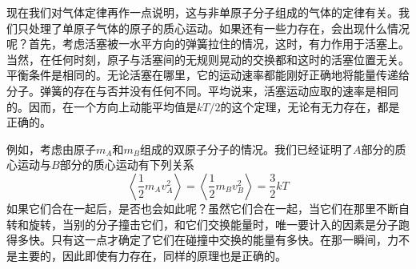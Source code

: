 现在我们对气体定律再作一点说明，这与非单原子分子组成的气体的定律有关。我们只处理了单原子气体的原子的质心运动。如果还有一些力存在，会出现什么情况呢？首先，考虑活塞被一水平方向的弹簧拉住的情况，这时，有力作用于活塞上。当然，在任何时刻，原子与活塞间的无规则晃动的交换都和这时的活塞位置无关。平衡条件是相同的。无论活塞在哪里，它的运动速率都能刚好正确地将能量传递给分子。弹簧的存在与否并没有任何不同。平均说来，活塞运动应取的速率是相同的。因而，在一个方向上动能平均值是$kT/2$的这个定理，无论有无力存在，都是正确的。

例如，考虑由原子$m_A$和$m_B$组成的双原子分子的情况。我们已经证明了$A$部分的质心运动与$B$部分的质心运动有下列关系
\begin{equation*}
    \left \langle \frac{1}{2}m_Av_A^2 \right \rangle = \left \langle \frac{1}{2}m_Bv_B^2 \right \rangle = \frac{3}{2}kT
\end{equation*}
如果它们合在一起后，是否也会如此呢？虽然它们合在一起，当它们在那里不断自转和旋转，当别的分子撞击它们，和它们交换能量时，唯一要计入的因素是分子跑得多快。只有这一点才确定了它们在碰撞中交换的能量有多快。在那一瞬间，力不是主要的，因此即使有力存在，同样的原理也是正确的。


